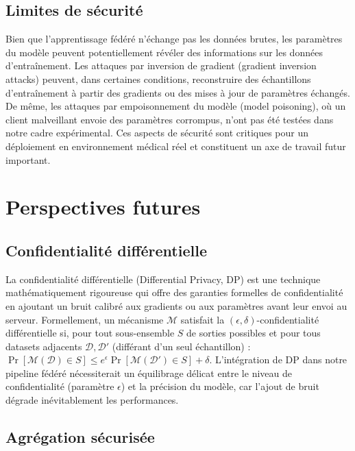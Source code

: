 \documentclass[12pt,a4paper]{report}
\begin{document}
\subsection{Limites de s\'{e}curit\'{e}}

Bien que l'apprentissage f\'{e}d\'{e}r\'{e} n'\'{e}change pas les donn\'{e}es brutes, les param\`{e}tres du mod\`{e}le peuvent potentiellement r\'{e}v\'{e}ler des informations sur les donn\'{e}es d'entra\^{i}nement. Les attaques par inversion de gradient (gradient inversion attacks) peuvent, dans certaines conditions, reconstruire des \'{e}chantillons d'entra\^{i}nement \`{a} partir des gradients ou des mises \`{a} jour de param\`{e}tres \'{e}chang\'{e}s. De m\^{e}me, les attaques par empoisonnement du mod\`{e}le (model poisoning), o\`{u} un client malveillant envoie des param\`{e}tres corrompus, n'ont pas \'{e}t\'{e} test\'{e}es dans notre cadre exp\'{e}rimental. Ces aspects de s\'{e}curit\'{e} sont critiques pour un d\'{e}ploiement en environnement m\'{e}dical r\'{e}el et constituent un axe de travail futur important.

\section{Perspectives futures}

\subsection{Confidentialit\'{e} diff\'{e}rentielle}

La confidentialit\'{e} diff\'{e}rentielle (Differential Privacy, DP) est une technique math\'{e}matiquement rigoureuse qui offre des garanties formelles de confidentialit\'{e} en ajoutant un bruit calibr\'{e} aux gradients ou aux param\`{e}tres avant leur envoi au serveur. Formellement, un m\'{e}canisme $\mathcal{M}$ satisfait la $(\epsilon, \delta)$-confidentialit\'{e} diff\'{e}rentielle si, pour tout sous-ensemble $S$ de sorties possibles et pour tous datasets adjacents $\mathcal{D}, \mathcal{D}'$ (diff\'{e}rant d'un seul \'{e}chantillon) : $\Pr[\mathcal{M}(\mathcal{D}) \in S] \leq e^{\epsilon} \Pr[\mathcal{M}(\mathcal{D}') \in S] + \delta$. L'int\'{e}gration de DP dans notre pipeline f\'{e}d\'{e}r\'{e} n\'{e}cessiterait un \'{e}quilibrage d\'{e}licat entre le niveau de confidentialit\'{e} (param\`{e}tre $\epsilon$) et la pr\'{e}cision du mod\`{e}le, car l'ajout de bruit d\'{e}grade in\'{e}vitablement les performances.

\subsection{Agr\'{e}gation s\'{e}curis\'{e}e}
\end{document}

